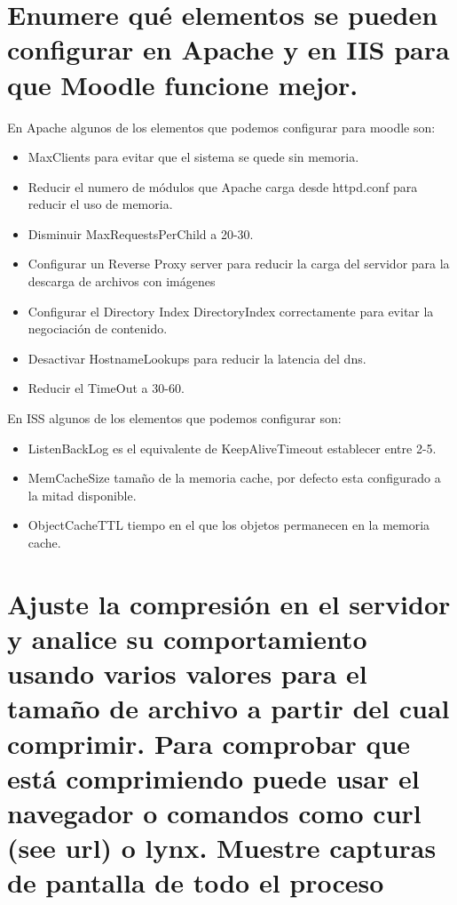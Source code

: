 \section[Cuestión 4]{ Enumere qué elementos se pueden configurar en Apache y en IIS para que Moodle funcione mejor.}

En Apache algunos de los elementos que podemos configurar para moodle \cite{moodle} son:

\begin{itemize}
	\item MaxClients para evitar que el sistema se quede sin memoria.
	\item Reducir el numero de módulos que Apache carga desde httpd.conf para reducir el uso de memoria.
	\item Disminuir MaxRequestsPerChild a 20-30.
	\item Configurar un Reverse Proxy server para reducir la carga del servidor para la descarga de archivos con imágenes
	\item Configurar el Directory Index DirectoryIndex correctamente para evitar la negociación de contenido.
	\item Desactivar HostnameLookups para reducir la latencia del dns.
	\item Reducir el TimeOut a 30-60.
	
\end{itemize}

En ISS algunos de los elementos que podemos configurar son:

\begin{itemize}
	\item ListenBackLog es el equivalente de KeepAliveTimeout establecer entre 2-5.
	\item MemCacheSize tamaño de la memoria cache, por defecto esta configurado a la mitad disponible.
	\item ObjectCacheTTL tiempo en el que los objetos permanecen en la memoria cache.
	
	
\end{itemize}

\section[Cuestión 5]{ Ajuste la compresión en el servidor y analice su comportamiento usando varios valores para el tamaño de archivo a partir del cual comprimir. Para comprobar que está comprimiendo puede usar el navegador o comandos como curl (see url) o lynx. Muestre capturas de pantalla de todo el proceso}

